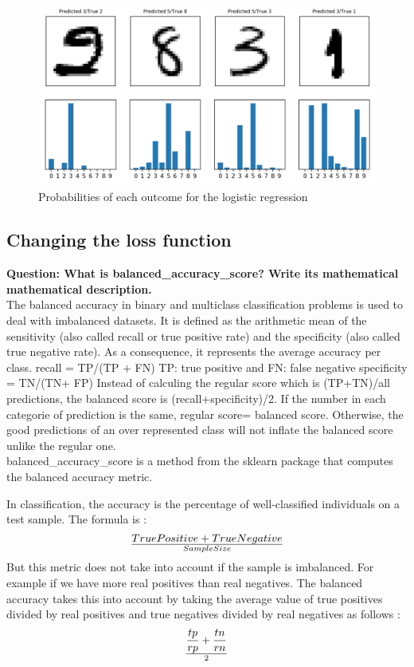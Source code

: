 \begin{figure}[h]
	\centering 
	\includegraphics[scale=0.4]{Pics/probas}
	\caption{Probabilities of each outcome for the logistic regression}
	\label{fig:probas}
\end{figure}

\subsection{Changing the loss function}
 
\textbf{Question: What is balanced\_accuracy\_score? Write its mathematical mathematical description.} \\

The balanced accuracy in binary and multiclass classification problems is used to deal with imbalanced datasets. 
It is defined as the arithmetic mean of the sensitivity (also called recall or true positive rate) and the specificity (also called true negative rate). As a consequence, it represents the average accuracy per class.
recall = TP/(TP + FN) TP: true positive and FN: false negative
specificity = TN/(TN+ FP)
Instead of calculing the regular score which is (TP+TN)/all predictions, the balanced score is (recall+specificity)/2. If the number in each categorie of prediction is the same, regular score= balanced score. Otherwise, the good predictions of an over represented class will not inflate the balanced score unlike the regular one.\\

balanced\_accuracy\_score is a method from the sklearn package that computes the balanced accuracy metric. 


In classification, the accuracy is the percentage of well-classified individuals on a test sample. The formula is : \begin{equation*}
True Positive + 	True Negative \over Sample Size
\end{equation*}
But this metric does not take into account if the sample is imbalanced. For example if we have more real positives than real negatives. The balanced accuracy takes this into account by taking the average value of true positives divided by real positives and true negatives divided by real negatives as follows : \begin{equation*} \frac{tp}{rp}+ \frac{tn}{rn} \over 2
\end{equation*} \\

